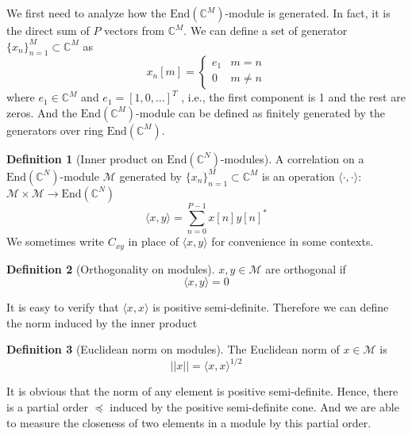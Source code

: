 \documentclass[12pt]{article}
\theoremstyle{definition}
\newtheorem{definition}{Definition}
\begin{document}
We first need to analyze how the $\mbox{End}\left(\mathbb{C}^M \right)$-module is generated. In fact, it is the direct sum of $P$ vectors from $\mathbb{C}^M$. We can define a set of generator $\{x_n \}_{n=1}^M\subset\mathbb{C}^M$ as 
$$
x_n[m]=\left\{
\begin{matrix}
	e_1&m=n\\
	0&m\not =n
\end{matrix}
\right.
$$
where $e_1\in\mathbb{C}^M$ and $e_1=[1,0,\dots]^T$ , i.e., the first component is 1 and the rest are zeros. And the $\mbox{End}\left(\mathbb{C}^M \right)$-module can be defined as finitely generated by the generators over ring $\mbox{End}\left(\mathbb{C}^M \right)$.
\begin{definition}[Inner product on $\mbox{End}\left(\mathbb{C}^N \right)$-modules]\label{def inner product}
	A correlation on a $\mbox{End}\left(\mathbb{C}^N \right)$-module $\mathcal{M}$ generated by $\{x_n \}_{n=1}^M\subset\mathbb{C}^M$ is an operation $\langle\cdot,\cdot\rangle$: $\mathcal{M}\times\mathcal{M}\rightarrow\mbox{End}\left(\mathbb{C}^N \right)$
	$$\langle x,y\rangle=\sum_{n=0}^{P-1}x[n]y[n]^*$$
	We sometimes write $C_{xy}$ in place of $\langle x,y\rangle$ for convenience in some contexts.
\end{definition}
\begin{definition}[Orthogonality on modules]\label{def orthogonality}
	$x,y\in\mathcal{M}$ are orthogonal if
	$$\langle x,y\rangle=0$$
\end{definition}
It is easy to verify that $\langle x,x\rangle$ is positive semi-definite. Therefore we can define the norm induced by the inner product
\begin{definition}[Euclidean norm on modules]\label{def norm}
	The Euclidean norm of $x\in\mathcal{M}$ is 
	$$||x||=\langle x,x\rangle^{1/2}$$
\end{definition}
It is obvious that the norm of any element is positive semi-definite. Hence, there is a partial order $\preceq$ induced by the positive semi-definite cone. And we are able to measure the closeness of two elements in a module by this partial order.
\end{document}
